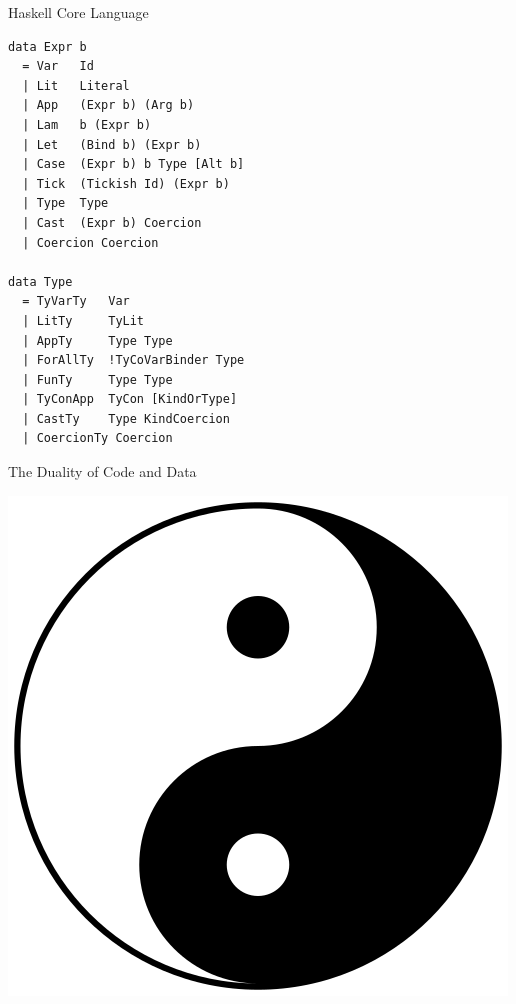 \documentclass[pdf]{beamer}
\begin{document}
\begin{frame}[fragile]{Haskell Core Language}
  \begin{verbatim}
data Expr b
  = Var   Id
  | Lit   Literal
  | App   (Expr b) (Arg b)
  | Lam   b (Expr b)
  | Let   (Bind b) (Expr b)
  | Case  (Expr b) b Type [Alt b]
  | Tick  (Tickish Id) (Expr b)
  | Type  Type
  | Cast  (Expr b) Coercion
  | Coercion Coercion

data Type
  = TyVarTy   Var
  | LitTy     TyLit
  | AppTy     Type Type
  | ForAllTy  !TyCoVarBinder Type
  | FunTy     Type Type
  | TyConApp  TyCon [KindOrType]
  | CastTy    Type KindCoercion
  | CoercionTy Coercion
  \end{verbatim}
\end{frame}

\begin{frame}{The Duality of Code and Data}
  \begin{center}
    \includegraphics[scale=0.35]{images/yin-yang}
  \end{center}
\end{frame}

\end{document}
